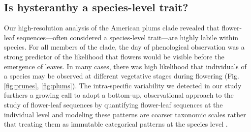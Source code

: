 \documentclass{article}[11pt]
\begin{document}



\subsection*{Is hysteranthy a species-level trait?}
Our high-resolution analysis of the American plums clade revealed that flower-leaf sequences---often considered a species-level trait---are highly labile within species. For all members of the clade, the day of phenological observation was a strong predictor of the likelihood that flowers would be visible before the emergence of leaves. %
In many cases, there was high likelihood that individuals of a species may be observed at different vegetative stages during flowering (Fig. \ref{fig:prunes}, \ref{fig:plums}). The intra-specific variability we detected in our study furthers a growing call to adopt a bottom-up, observational approach to the study of flower-leaf sequences by quantifying flower-leaf sequences  at the individual level and modeling these patterns are coarser taxonomic scales rather that treating them as immutable categorical patterns at the species level \citep{Buonaiuto2020}.  
\end{document}
